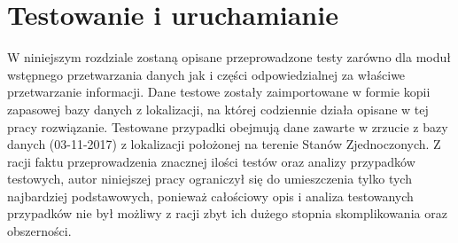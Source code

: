 \documentclass[a4paper]{book}
\begin{document}
\chapter{Testowanie i uruchamianie}
\label{rozdzial6}
W niniejszym rozdziale zostaną opisane przeprowadzone testy zarówno dla moduł wstępnego przetwarzania danych jak i części odpowiedzialnej za właściwe przetwarzanie informacji. Dane testowe zostały zaimportowane w formie kopii zapasowej bazy danych z lokalizacji, na której codziennie działa opisane w tej pracy rozwiązanie. Testowane przypadki obejmują dane zawarte w zrzucie z bazy danych (03-11-2017) z lokalizacji położonej na terenie Stanów Zjednoczonych. Z racji faktu przeprowadzenia znacznej ilości testów oraz analizy przypadków testowych, autor niniejszej pracy ograniczył się do umieszczenia tylko tych najbardziej podstawowych, ponieważ całościowy opis i analiza testowanych przypadków nie był możliwy z racji zbyt ich dużego stopnia skomplikowania oraz obszerności. 
\end{document}
